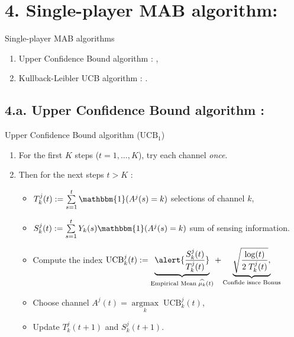 \documentclass[12pt,english,ignorenonframetext,aspectratio=169,]{beamer}
\providecommand{\tightlist}{%
  \setlength{\itemsep}{0pt}\setlength{\parskip}{0pt}}
\begin{document}
\section{\hfill{}4. Single-player MAB algorithm: \klUCB\hfill{}}

\begin{frame}{Single-player MAB algorithms}

\begin{enumerate}
\def\labelenumi{\arabic{enumi}.}
\tightlist
\item
  Upper Confidence Bound algorithm : \UCB,\vspace*{15pt}
\item
  Kullback-Leibler UCB algorithm : \klUCB.
\end{enumerate}

\end{frame}



\subsection{\hfill{}4.a. Upper Confidence Bound algorithm : \UCB\hfill{}}

\begin{frame}{Upper Confidence Bound algorithm (\(\mathrm{UCB}_1\))}

\begin{enumerate}
\def\labelenumi{\arabic{enumi}.}
\tightlist
\item
  For the first \(K\) steps (\(t=1,\dots,K\)), try each channel
  \emph{once}.
\item
  Then for the next steps \(t > K\) :

  \begin{itemize}
  \tightlist
  \item
  \(T_k^j(t) := \sum\limits_{s=1}^{t} \mathbbm{1}(A^j(s) = k)\) selections of channel \(k\),
  \item
  \(S_k^j(t) := \sum\limits_{s=1}^{t} Y_{k}(s) \mathbbm{1}(A^j(s) = k)\) sum of sensing information.
  \item
    Compute the index
    \(\mathrm{UCB}_k^j(t) := \underbrace{\alert{\frac{S_k^j(t)}{T_k^j(t)}}}_{\text{Empirical Mean}\; \widehat{\mu_k}(t)} + \underbrace{\sqrt{\frac{\log(t)}{2 \; T_k^j(t)}},}_{\text{Confide isnce Bonus}}\)
  \item
    Choose channel \(A^j(t) = \mathop{\arg\max}\limits_{k} \; \mathrm{UCB}_k^j(t)\),
  \item
    Update \(T_k^j(t+1)\) and \(S_k^j(t+1)\).
  \end{itemize}
\end{enumerate}


\end{frame}
\end{document}
